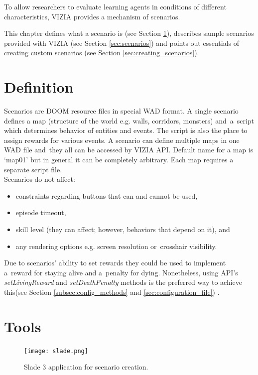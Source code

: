 \documentclass[english,bachelor,a4paper,twoside]{ppfcmthesis}
\begin{document}
To allow researchers to evaluate learning agents in conditions of different characteristics, VIZIA provides a mechanism of scenarios.

This chapter defines what a scenario is (see Section \ref{sec:scenario_definition}), describes sample scenarios provided with VIZIA (see Section \ref{sec:scenarios}) and points out essentials of creating custom scenarios (see Section \ref{sec:creating_scenarios}).

\section{Definition}\label{sec:scenario_definition}
	Scenarios are DOOM resource files in special WAD format. A single scenario defines a map (structure of the world e.g. walls, corridors, monsters) and~a~script which determines behavior of entities and events. The script is also the place to assign rewards for various events. A scenario can define multiple maps in one WAD file and~they all can be accessed by VIZIA API. Default name for a map is `map01' but in general it can be completely arbitrary. Each map requires a separate script file.
	\\
	Scenarios do not affect:
	\begin{itemize}
		\item constraints regarding buttons that can and cannot be used,
		\item episode timeout,
		\item skill level (they can affect; however, behaviors that depend on it), and
		\item any rendering options e.g. screen resolution or~crosshair visibility.
	\end{itemize}

	Due to scenarios' ability to set rewards they could be used to implement a~reward for staying alive and a~penalty for dying. Nonetheless, using API's \emph{setLivingReward} and \emph{setDeathPenalty} methods is the preferred way to achieve this(see Section \ref{subsec:config_methods} and \ref{sec:configuration_file}) .

\section{Tools}\label{sec:tools}
	\begin{figure}
			\centering
			\texttt{[image: slade.png]}
			\caption{Slade 3 application for scenario creation.}\label{fig:slade}
	\end{figure}
\end{document}
